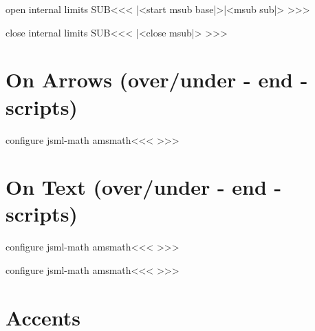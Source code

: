 {\<open internal limits SUB\><<<
{|<start msub base|>}|<msub sub|>%
>>>

\<close internal limits SUB\><<<
|<close msub|>%
>>>






\section{On Arrows (over/under - end - scripts)}



\<configure jsml-math amsmath\><<<
\renewcommand{\xrightarrow}[2][]{%
   \if :#1:
      \HCode{|<msup limits base|>}%
        \rightarrow
        |<msup limits script super|>#2%
        |<close limits sup|>%
   \else
      \HCode{|<start limits msubsup base|>}%
        \leftarrow
        |<msubsup limits sub|>#1%
        |<msubsup limits sup|>#2%
        |<close limits script|>%
   \fi
}
\renewcommand{\xleftarrow}[2][]{%
   \if :#1:
      \HCode{|<msup limits base|>}%
        \leftarrow
        |<msup limits script super|>#2%
        |<close limits sup|>%
   \else
      \HCode{|<start limits msubsup base|>}%
        \leftarrow
        |<msubsup limits sub|>#1%
        |<msubsup limits sup|>#2%
        |<close limits script|>%
   \fi
}
>>>




\section{On Text (over/under - end - scripts)}

\<configure jsml-math amsmath\><<<
\def\overset#1#2{{%
      \HCode{|<msup limits base|>}%
        #2%
        |<msup limits script super|>#1%
        |<close limits sup|>%
}}
\def\underset#1#2{{%
      \HCode{|<msub limits base|>}%
        #2%
        |<msub limits script sub|>#1%
        |<close limits sub|>%
}}
>>>






\<configure jsml-math amsmath\><<<
\def\sideset#1#2#3{{\Tg<mrow class="sideset"\Hnewline
        >{\HCode{}}#1{\HCode{}#3}#2\Tg</mrow>}}
>>>



\section{Accents}

}
